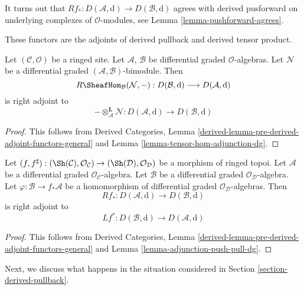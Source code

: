 \noindent
It turns out that
$Rf_* : D(\mathcal{A}, \text{d}) \to D(\mathcal{B}, \text{d})$
agrees with derived pusforward on underlying complexes
of $\mathcal{O}$-modules, see Lemma \ref{lemma-pushforward-agrees}.

\medskip\noindent
These functors are the adjoints of derived pullback and
derived tensor product.

\begin{lemma}
\label{lemma-derived-adjoint-tensor-hom}
Let $(\mathcal{C}, \mathcal{O})$ be a ringed site. Let
$\mathcal{A}$, $\mathcal{B}$ be differential graded $\mathcal{O}$-algebras.
Let $\mathcal{N}$ be a  differential graded
$(\mathcal{A}, \mathcal{B})$-bimodule. Then
$$
R\SheafHom_\mathcal{B}(\mathcal{N}, -) :
D(\mathcal{B}, \text{d})
\longrightarrow
D(\mathcal{A}, \text{d})
$$
is right adjoint to
$$
- \otimes_\mathcal{A}^\mathbf{L} \mathcal{N} :
D(\mathcal{A}, \text{d})
\longrightarrow
D(\mathcal{B}, \text{d})
$$
\end{lemma}

\begin{proof}
This follows from Derived Categories, Lemma
\ref{derived-lemma-pre-derived-adjoint-functors-general}
and Lemma \ref{lemma-tensor-hom-adjunction-dg}.
\end{proof}

\begin{lemma}
\label{lemma-derived-adjoint-push-pull}
Let $(f, f^\sharp) : (\Sh(\mathcal{C}), \mathcal{O}_\mathcal{C})
\to (\Sh(\mathcal{D}), \mathcal{O}_\mathcal{D})$
be a morphism of ringed topoi. Let $\mathcal{A}$ be a differential
graded $\mathcal{O}_\mathcal{C}$-algebra. Let $\mathcal{B}$ be a
differential graded $\mathcal{O}_\mathcal{D}$-algebra. Let
$\varphi : \mathcal{B} \to f_*\mathcal{A}$ be a homomorphism
of differential graded $\mathcal{O}_\mathcal{D}$-algebras.
Then
$$
Rf_* : 
D(\mathcal{A}, \text{d})
\longrightarrow
D(\mathcal{B}, \text{d})
$$
is right adjoint to
$$
Lf^* :
D(\mathcal{B}, \text{d})
\longrightarrow
D(\mathcal{A}, \text{d})
$$
\end{lemma}

\begin{proof}
This follows from Derived Categories, Lemma
\ref{derived-lemma-pre-derived-adjoint-functors-general}
and Lemma \ref{lemma-adjunction-push-pull-dg}.
\end{proof}

\noindent
Next, we discuss what happens in the situation considered in
Section \ref{section-derived-pullback}.

